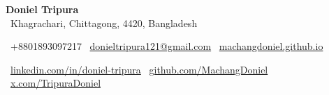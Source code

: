 
\begin{center}
    {\Huge\textbf{Doniel Tripura}} \\
    \small \faMapMarker~Khagrachari, Chittagong, 4420, Bangladesh
\end{center}

\vspace{-4mm}

\begin{center}
    \small
    \faPhone~+8801893097217 \quad
    \faEnvelope~\href{mailto:donieltripura121@gmail.com}{donieltripura121@gmail.com} \quad
    \faLaptop~\href{https://machangdoniel.github.io}{machangdoniel.github.io}
\end{center}

\vspace{-4mm}

\begin{center}
    \small
    \faLinkedin~\href{https://www.linkedin.com/in/doniel-tripura-7a82281b9}{linkedin.com/in/doniel-tripura} \quad
    \faGithub~\href{https://github.com/MachangDoniel}{github.com/MachangDoniel} \quad
    \faTwitter~\href{https://x.com/TripuraDoniel}{x.com/TripuraDoniel}
\end{center}

\vspace{-4mm}
